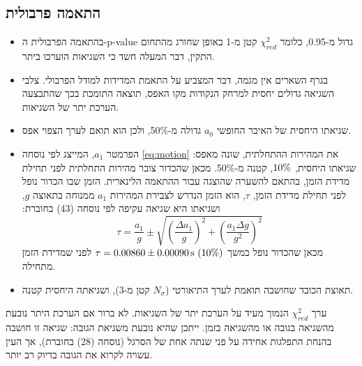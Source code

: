 \documentclass[10pt,a4paper]{article}
\newcommand{\textenglish}[1]{\foreignlanguage{english}{#1}}
\newcommand{\partner}[1]{\textcolor{partnergreen}{#1}}
\newcommand{\U}[1]{\,\mathrm{#1}}
\begin{document}
\subsection*{התאמה פרבולית}
\begin{itemize}
  \item \partner{בהתאמה הפרבולית ה-}\textenglish{p-value} \partner{גדול מ-0.95, כלומר} $\chi^2_{red}$ קטן מ-1 באופן \partner{שחורג מהתחום התקין, דבר המעלה חשד כי השגיאות הוערכו ביתר}.
  \item בגרף השארים אין מגמה, דבר המצביע על התאמת המדידות למודל הפרבולי. צלבי השגיאה גדולים יחסית למרחק הנקודות מקו האפס, \partner{תוצאה התומכת בכך שהתבצעה הערכת יתר של השגיאות}.
  \item \partner{שגיאתו היחסית של האיבר החופשי $a_0$ גדולה מ-50\%, ולכן הוא תואם לערך הצפוי אפס.}
  \item \partner{הפרמטר $a_1$, המייצג לפי נוסחה \eqref{eq:motion} את המהירות ההתחלתית, שונה מאפס: שגיאתו היחסית, $10\%$, קטנה מ-50\%. מכאן שהכדור צובר מהירות התחלתית לפני תחילת מדידת הזמן, בהתאם להשערה שהוצגה עבור ההתאמה הלינארית. הזמן שבו הכדור נופל לפני תחילת מדידת הזמן, $\tau$, הוא הזמן הנדרש לצבירת המהירות $a_1$ ממנוחה בתאוצה $g$, ושגיאתו היא שגיאה עקיפה לפי נוסחה (43) בחוברת:}
{\color{partnergreen}
\begin{equation}\label{eq:tau}
\tau = \frac{a_1}{g} \pm \sqrt{\left(\frac{\Delta a_1}{g}\right)^2 + \left(\frac{a_1 \Delta g}{g^2}\right)^2}
\end{equation}}
  \partner{מכאן שהכדור נופל במשך $\tau = \DelayTau\U{s}\ (\DelayTauRel)$ לפני שמדידת הזמן מתחילה.}
  \item \partner{תאוצת הכובד שחושבה תואמת לערך התיאורטי ($N_\sigma$ קטן מ-3), ושגיאתה היחסית קטנה.}
\end{itemize}
\partner{ערך $\chi^2_{red}$ הנמוך מעיד על הערכת יתר של השגיאות. לא ברור אם הערכת היתר נובעת מהשגיאה בגובה או מהשגיאה בזמן. ייתכן שהיא נובעת משגיאת הגובה: שגיאה זו חושבה בהנחת התפלגות אחידה על פני שנתה אחת של הסרגל (נוסחה (28) בחוברת), אך העין עשויה לקרוא את הגובה בדיוק רב יותר.}
\end{document}
